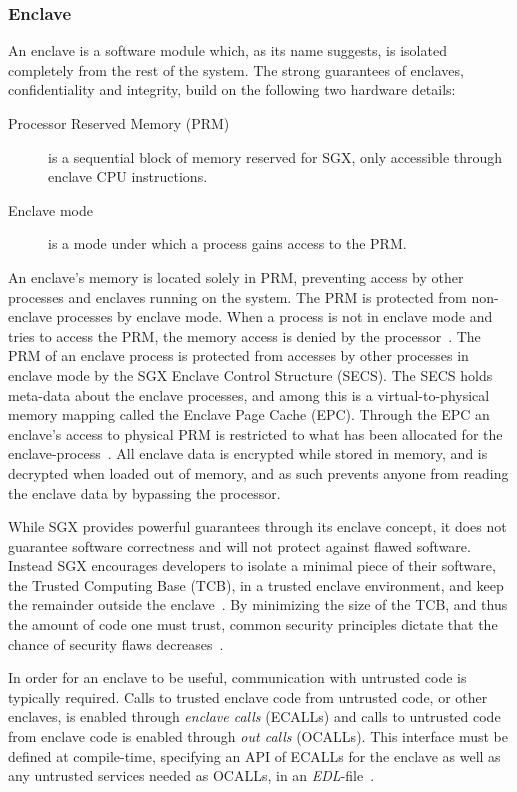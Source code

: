 \documentclass{article}
\begin{document}
			\subsubsection{Enclave}
			\label{subsec:enclave}

			An enclave is a software module which, as its name suggests, is isolated completely from the rest of the system.
			The strong guarantees of enclaves, confidentiality and integrity, build on the following two hardware details:
			\begin{description}
				\item [Processor Reserved Memory (PRM)] is a sequential block of memory reserved for SGX, only accessible through enclave CPU instructions.
				\item [Enclave mode] is a mode under which a process gains access to the PRM.
			\end{description}
			An enclave's memory is located solely in PRM, preventing access by other processes and enclaves running on the system.
			The PRM is protected from non-enclave processes by enclave mode.
			When a process is not in enclave mode and tries to access the PRM, the memory access is denied by the processor~\cite{costan_intel_2016}.
			The PRM of an enclave process is protected from accesses by other processes in enclave mode by the SGX Enclave Control Structure (SECS).
			The SECS holds meta-data about the enclave processes, and among this is a virtual-to-physical memory mapping called the Enclave Page Cache (EPC).
			Through the EPC an enclave's access to physical PRM is restricted to what has been allocated for the enclave-process~\cite{costan_intel_2016}.
			All enclave data is encrypted while stored in memory, and is decrypted when loaded out of memory, and as such prevents anyone from reading the enclave data by bypassing the processor.

			While SGX provides powerful guarantees through its enclave concept, it does not guarantee software correctness and will not protect against flawed software.
			Instead SGX encourages developers to isolate a minimal piece of their software, the Trusted Computing Base (TCB), in a trusted enclave environment, and keep the remainder outside the enclave~\cite{intel_sgx_guide}.
			By minimizing the size of the TCB, and thus the amount of code one must trust, common security principles dictate that the chance of security flaws decreases~\cite{intel_sgx_guide}.

			In order for an enclave to be useful, communication with untrusted code is typically required.
			Calls to trusted enclave code from untrusted code, or other enclaves, is enabled through \textit{enclave calls} (ECALLs) and calls to untrusted code from enclave code is enabled through \textit{out calls} (OCALLs).
			This interface must be defined at compile-time, specifying an API of ECALLs for the enclave as well as any untrusted services needed as OCALLs, in an \textit{EDL}-file~\cite{intel_sgx_guide}.
\end{document}
